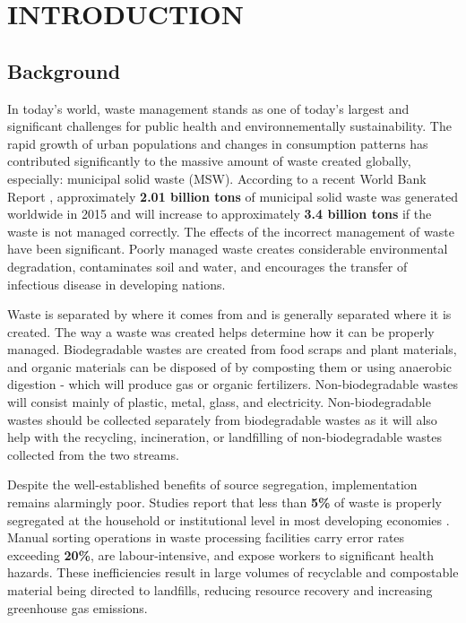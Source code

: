 \chapter{INTRODUCTION}

\section{Background}

In today's world, waste management stands as one of today's largest and significant challenges for public health and environnementally sustainability. The rapid growth of urban populations and changes in consumption patterns has contributed significantly to the massive amount of waste created globally, especially: municipal solid waste (MSW). According to a recent World Bank Report \cite{worldbank2018}, approximately \textbf{2.01 billion tons} of municipal solid waste was generated worldwide in 2015 and will increase to approximately \textbf{3.4 billion tons} if the waste is not managed correctly. The effects of the incorrect management of waste have been significant. Poorly managed waste creates considerable environmental degradation, contaminates soil and water, and encourages the transfer of infectious disease in developing nations.

Waste is separated by where it comes from and is generally separated where it is created. The way a waste was created helps determine how it can be properly managed. Biodegradable wastes are created from food scraps and plant materials, and organic materials can be disposed of by composting them or using anaerobic digestion - which will produce gas or organic fertilizers. Non-biodegradable wastes will consist mainly of plastic, metal, glass, and electricity. Non-biodegradable wastes should be collected separately from biodegradable wastes as it will also help with the recycling, incineration, or landfilling of non-biodegradable wastes collected from the two streams.

Despite the well-established benefits of source segregation, implementation remains alarmingly poor. Studies report that less than \textbf{5\%} of waste is properly segregated at the household or institutional level in most developing economies \cite{systematic_review2025}. Manual sorting operations in waste processing facilities carry error rates exceeding \textbf{20\%}, are labour-intensive, and expose workers to significant health hazards. These inefficiencies result in large volumes of recyclable and compostable material being directed to landfills, reducing resource recovery and increasing greenhouse gas emissions.

